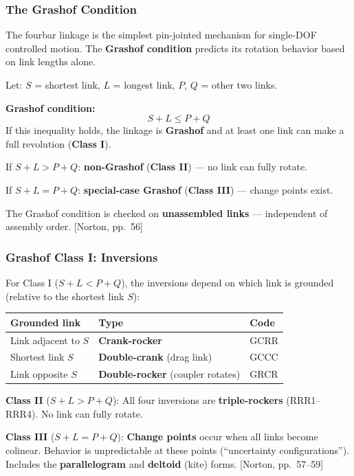 \documentclass[10pt,aspectratio=43]{beamer}
\newcommand{\pref}[1]{\vfill\hfill{\scriptsize\color{gray}[Norton, pp.~#1]}}
\begin{document}
\begin{frame}
\frametitle{The Grashof Condition}

The fourbar linkage is the simplest pin-jointed mechanism for single-DOF controlled motion. The \textbf{Grashof condition} predicts its rotation behavior based on link lengths alone.

\vspace{4pt}
Let: $S$ = shortest link, $L$ = longest link, $P$, $Q$ = other two links.

\begin{redbox}
\textbf{Grashof condition:}
\[
  S + L \leq P + Q \tag{2.8}
\]
If this inequality holds, the linkage is \textbf{Grashof} and at least one link can make a full revolution (\textbf{Class I}).

If $S + L > P + Q$: \textbf{non-Grashof} (\textbf{Class II}) --- no link can fully rotate.

If $S + L = P + Q$: \textbf{special-case Grashof} (\textbf{Class III}) --- change points exist.
\end{redbox}

\vspace{4pt}
The Grashof condition is checked on \textbf{unassembled links} --- independent of assembly order.
\pref{56}
\end{frame}

\begin{frame}
\frametitle{Grashof Class I: Inversions}

For Class I ($S + L < P + Q$), the inversions depend on which link is grounded (relative to the shortest link $S$):

\vspace{6pt}
\begin{center}
\small
\begin{tabular}{l|l|l}
\toprule
\textbf{Grounded link} & \textbf{Type} & \textbf{Code} \\
\midrule
Link adjacent to $S$ & \textbf{Crank-rocker} & GCRR \\
Shortest link $S$ & \textbf{Double-crank} (drag link) & GCCC \\
Link opposite $S$ & \textbf{Double-rocker} (coupler rotates) & GRCR \\
\bottomrule
\end{tabular}
\end{center}

\vspace{6pt}
\textbf{Class II} ($S + L > P + Q$): All four inversions are \textbf{triple-rockers} (RRR1--RRR4). No link can fully rotate.

\vspace{6pt}
\textbf{Class III} ($S + L = P + Q$): \textbf{Change points} occur when all links become colinear. Behavior is unpredictable at these points (``uncertainty configurations''). Includes the \textbf{parallelogram} and \textbf{deltoid} (kite) forms.
\pref{57--59}
\end{frame}
\end{document}
